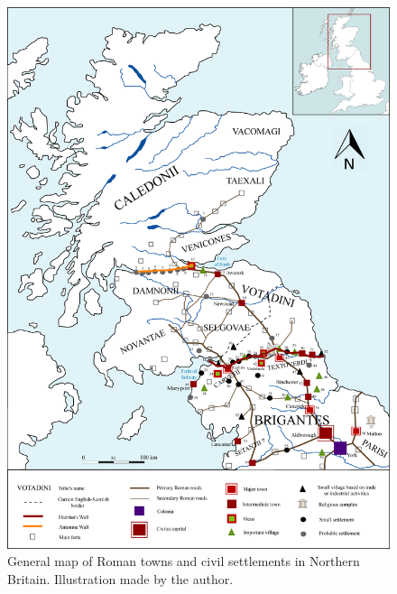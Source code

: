 	\begin{figure}
		\includegraphics[width=\linewidth]{figures/rayer_Fig2.jpg}
		\caption{General map of Roman towns and civil settlements in Northern Britain. Illustration made by the author.}
		\label{fig:Rayer_Fig2}
	\end{figure}


